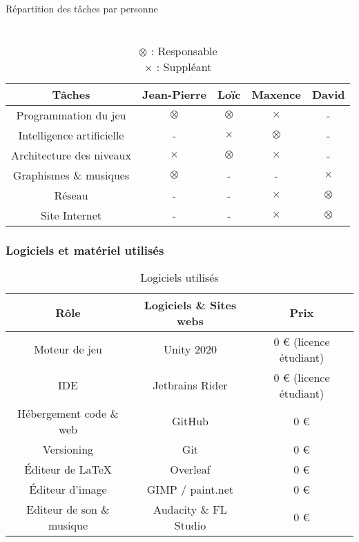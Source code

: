 \documentclass{article}
\begin{document}
\begin{table}[h!]
    \centering
    \caption*{Répartition des tâches par personne}
    \begin{tabular}{|c|c|c|c|c|}
        \hline
        Tâches & Jean-Pierre & Loïc & Maxence & David \\
        \hline
        Programmation du jeu & $\otimes$ & $\otimes$ & $\times$ & - \\
        \hline
        Intelligence artificielle & - & $\times$ & $\otimes$ & - \\
        \hline
        Architecture des niveaux & $\times$ & $\otimes$ & $\times$ & - \\
        \hline
        Graphismes \& musiques & $\otimes$ & - & - & $\times$ \\
        \hline
        Réseau & - & - & $\times$ & $\otimes$ \\
        \hline
        Site Internet & - & - & $\times$ & $\otimes$ \\
        \hline
    \end{tabular}
    \caption*{
        \\ $\otimes$ : Responsable
        \\ $\times$ : Suppléant
    }
    \label{table:repartition}
\end{table}

\pagebreak

\subsubsection{Logiciels et matériel utilisés}

\begin{table}[h!]
    \centering
    \begin{tabular}{|c|c|c|}
        \hline
        Rôle & Logiciels \& Sites webs & Prix \\
        \hline
        Moteur de jeu & Unity 2020 & 0 \euro{} (licence étudiant) \\
        \hline
        IDE & Jetbrains Rider & 0 \euro{} (licence étudiant) \\
        \hline
        Hébergement code \& web & GitHub & 0 \euro{} \\
        \hline
        Versioning & Git & 0 \euro{} \\
        \hline
        Éditeur de LaTeX & Overleaf & 0 \euro{} \\
        \hline
        Éditeur d'image & GIMP / paint.net & 0 \euro{} \\
        \hline
        Editeur de son \& musique & Audacity \& FL Studio & 0 \euro{} \\
        \hline
    \end{tabular}
    \caption*{Logiciels utilisés}
    \label{tab:logiciels}
\end{table}
\end{document}
